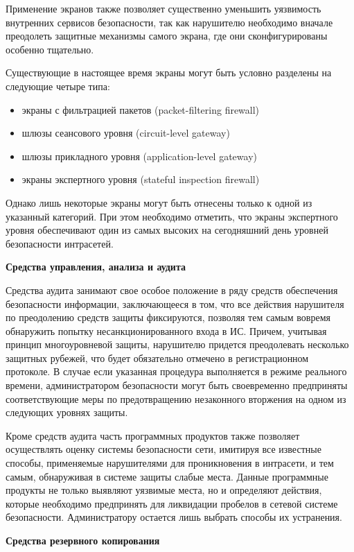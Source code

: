 Применение экранов также позволяет существенно уменьшить уязвимость внутренних сервисов безопасности, так
как нарушителю необходимо вначале преодолеть защитные механизмы самого экрана,
где они сконфигурированы особенно тщательно.

Существующие в настоящее время экраны могут быть условно разделены на следующие четыре типа:
\begin{itemize}
    \item экраны с фильтрацией пакетов (packet-filtering firewall)
    \item шлюзы сеансового уровня (circuit-level gateway)
    \item шлюзы прикладного уровня (application-level gateway)
    \item экраны экспертного уровня (stateful inspection firewall)
\end{itemize}

Однако лишь некоторые экраны могут быть отнесены только к одной из указанный категорий.
При этом необходимо отметить, что экраны экспертного уровня обеспечивают один из самых высоких на сегодняшний
день уровней безопасности интрасетей.

\bigbreak
\textbf{Средства управления, анализа и аудита}

Средства аудита занимают свое особое положение в ряду средств обеспечения безопасности информации,
заключающееся в том, что все действия нарушителя по преодолению средств защиты фиксируются, позволяя тем самым
вовремя обнаружить попытку несанкционированного входа в ИС. Причем, учитывая принцип многоуровневой защиты,
нарушителю придется преодолевать несколько защитных рубежей, что будет обязательно отмечено в регистрационном
протоколе. В случае если указанная процедура выполняется в режиме реального времени, администратором безопасности
могут быть своевременно предприняты соответствующие меры по предотвращению незаконного вторжения на одном из
следующих уровнях защиты.

Кроме средств аудита часть программных продуктов также позволяет осуществлять оценку системы безопасности сети,
имитируя все известные способы, применяемые нарушителями для проникновения в интрасети, и тем самым, обнаруживая
в системе защиты слабые места. Данные программные продукты не только выявляют уязвимые места, но и определяют
действия, которые необходимо предпринять для ликвидации пробелов в сетевой системе безопасности. Администратору
остается лишь выбрать способы их устранения.

\bigbreak
\textbf{Средства резервного копирования}

